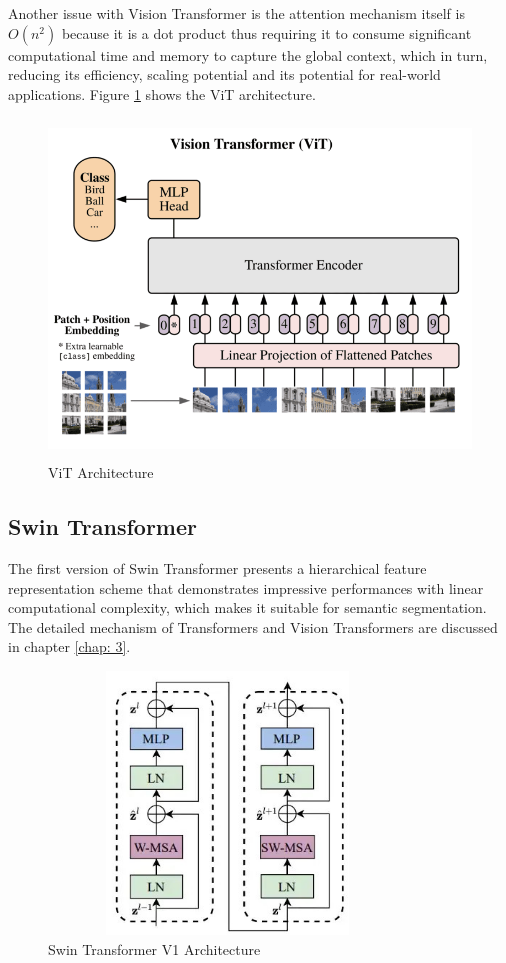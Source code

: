Another issue with Vision Transformer is the attention mechanism itself is $O(n^2)$ because it is a dot product thus requiring it to consume significant computational time and memory to capture the global context, which in turn, reducing its efficiency, scaling potential and its potential for real-world applications. Figure \ref{fig:vit} shows the ViT architecture.

\begin{figure}[ht]
\includegraphics[width=13.5cm, height=9cm]{images/vision transformer.png}
\centering
\caption{ViT Architecture}
\label{fig:vit}
\end{figure}

\subsection{Swin Transformer}
The first version of Swin Transformer \cite{swin-v1} presents a hierarchical feature representation scheme that demonstrates impressive performances with linear computational complexity, which makes it suitable for semantic segmentation. The detailed mechanism of Transformers and Vision Transformers are discussed in chapter \ref{chap: 3}.

\FloatBarrier
\begin{figure}[ht]
\includegraphics[width=9.5cm, height=7cm]{images/swin-architecture.jpg}
\centering
\caption{Swin Transformer V1 Architecture}
\label{fig:swin architecture}
\end{figure}

